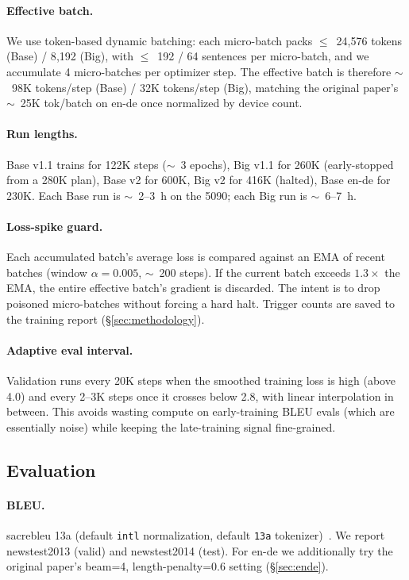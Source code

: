 \paragraph{Effective batch.} We use token-based dynamic batching: each micro-batch packs $\leq$~24{,}576 tokens (Base) / 8{,}192 (Big), with $\leq$~192 / 64 sentences per micro-batch, and we accumulate 4 micro-batches per optimizer step. The effective batch is therefore $\sim$~98K tokens/step (Base) / 32K tokens/step (Big), matching the original paper's $\sim$~25K tok/batch on en-de once normalized by device count.

\paragraph{Run lengths.} Base v1.1 trains for 122K steps ($\sim$~3 epochs), Big v1.1 for 260K (early-stopped from a 280K plan), Base v2 for 600K, Big v2 for 416K (halted), Base en-de for 230K. Each Base run is $\sim$~2--3~h on the 5090; each Big run is $\sim$~6--7~h.

\paragraph{Loss-spike guard.} Each accumulated batch's average loss is compared against an EMA of recent batches (window $\alpha{=}0.005$, $\sim$~200 steps). If the current batch exceeds $1.3\times$ the EMA, the entire effective batch's gradient is discarded. The intent is to drop poisoned micro-batches without forcing a hard halt. Trigger counts are saved to the training report (\S\ref{sec:methodology}).

\paragraph{Adaptive eval interval.} Validation runs every 20K steps when the smoothed training loss is high (above 4.0) and every 2--3K steps once it crosses below 2.8, with linear interpolation in between. This avoids wasting compute on early-training BLEU evals (which are essentially noise) while keeping the late-training signal fine-grained.

\subsection{Evaluation}
\paragraph{BLEU.} sacrebleu 13a (default \texttt{intl} normalization, default \texttt{13a} tokenizer)~\cite{post2018call}. We report newstest2013 (valid) and newstest2014 (test). For en-de we additionally try the original paper's beam=4, length-penalty=0.6 setting (\S\ref{sec:ende}).

